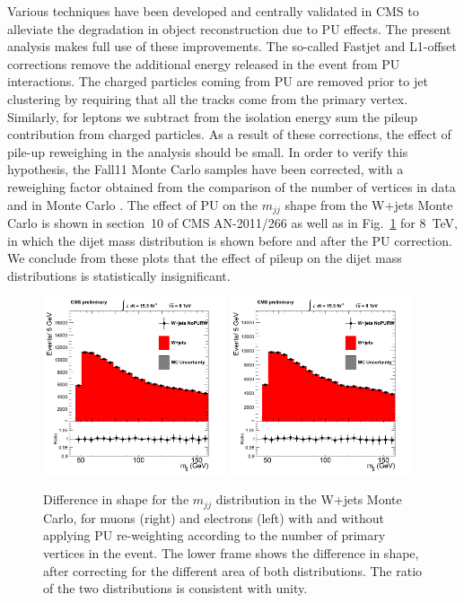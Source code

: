\par
Various techniques have been developed and centrally validated in CMS to 
alleviate the degradation in object reconstruction due to PU effects.
The present analysis makes full use of these improvements. 
The so-called Fastjet and L1-offset corrections remove the additional 
energy released in the event from PU interactions.
The charged particles coming from PU are removed prior to 
jet clustering by requiring that all the tracks come from the primary vertex. 
Similarly, for leptons we subtract from the isolation 
energy sum the pileup contribution from charged particles.
As a result of these corrections, 
the effect of pile-up reweighing in the analysis should be small.
In order to verify this hypothesis, the Fall11 Monte Carlo samples have 
been corrected, with a reweighing factor obtained from the comparison of 
the number of vertices in data and in Monte Carlo .
The effect of PU on the $m_{jj}$ shape from the W+jets Monte Carlo is 
shown in section~10 of CMS AN-2011/266 as well as in Fig.~\ref{fig:pu_MCcomp} for 8~TeV, in which the dijet mass distribution 
is shown before and after the PU correction. 
We conclude from these plots that the effect of pileup on the dijet mass
distributions is statistically insignificant.

\begin{figure}[h!] {\centering
{}\linewidth
\includegraphics[width=0.48\textwidth]{figs/puchecks/mu_PUvsNoPUReweightingmjj.png}
\includegraphics[width=0.48\textwidth]{figs/puchecks/el_PUvsNoPUReweightingmjj.png}
\caption{Difference in shape for the $m_{jj}$ distribution in the W+jets 
Monte Carlo, for muons (right) and electrons (left) with and without applying 
PU re-weighting according to the number of primary vertices in the event. 
The lower frame shows the difference in shape, 
after correcting for the different area of both distributions.
The ratio of the two distributions is consistent with unity.} 
\label{fig:pu_MCcomp}}
\end{figure}


